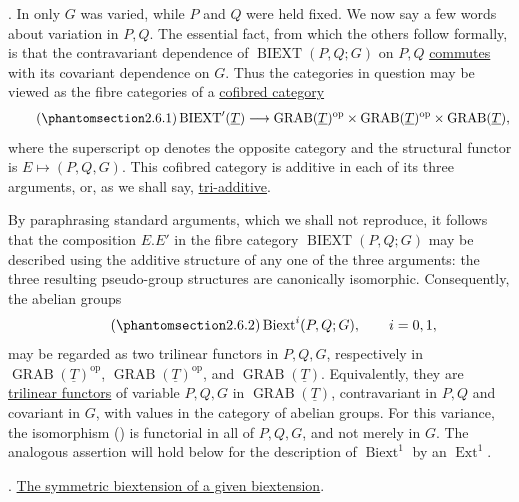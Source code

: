 
. In  only $G$ was varied, while $P$ and $Q$ were held fixed.
We now say a few words about variation in $P,Q$. The essential fact,
from which the others follow formally, is that the contravariant
dependence of $\operatorname{BIEXT}(P,Q;G)$ on $P,Q$
\underline{commutes} with its covariant dependence on $G$. Thus the
categories in question may be viewed as the fibre categories of a
\underline{cofibred category}
\begin{equation}\tag{\SGARefTarget{sga7.sga7i.evii.n2-6-1}{2.6.1}}
 \operatorname{BIEXT}'(\underline T)
 \longrightarrow
 \operatorname{GRAB}(\underline T)^{\mathrm{op}}\times
 \operatorname{GRAB}(\underline T)^{\mathrm{op}}\times
 \operatorname{GRAB}(\underline T),
\end{equation}
where the superscript $\mathrm{op}$ denotes the opposite category and
the structural functor is $E\mapsto(P,Q,G)$. This cofibred category is
additive in each of its three arguments, or, as we shall say,
\underline{tri-additive}.

By paraphrasing standard arguments, which we shall not reproduce, it
follows that the composition $E.E'$ in the fibre category
$\operatorname{BIEXT}(P,Q;G)$ may be described using the additive
structure of any one of the three arguments: the three resulting
pseudo-group structures are canonically isomorphic. Consequently, the
abelian groups
\begin{equation}\tag{\SGARefTarget{sga7.sga7i.evii.n2-6-2}{2.6.2}}
 \operatorname{Biext}^{i}(P,Q;G),\qquad i=0,1,
\end{equation}
may be regarded as two trilinear functors in $P,Q,G$, respectively in
$\operatorname{GRAB}(\underline T)^{\mathrm{op}}$,
$\operatorname{GRAB}(\underline T)^{\mathrm{op}}$, and
$\operatorname{GRAB}(\underline T)$. Equivalently, they are
\underline{trilinear functors} of variable $P,Q,G$ in
$\operatorname{GRAB}(\underline T)$, contravariant in $P,Q$ and
covariant in $G$, with values in the category of abelian groups.
For this variance, the isomorphism () is functorial in all of
$P,Q,G$, and not merely in $G$. The analogous assertion will hold
below for the description of $\operatorname{Biext}^{1}$ by an
$\operatorname{Ext}^{1}$.

. \underline{The symmetric biextension of a given biextension}.

